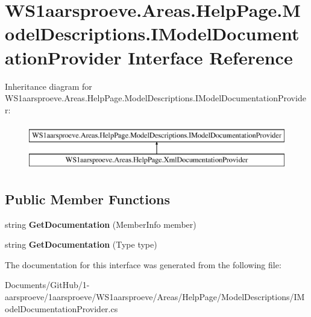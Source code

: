 \hypertarget{interface_w_s1aarsproeve_1_1_areas_1_1_help_page_1_1_model_descriptions_1_1_i_model_documentation_provider}{}\section{W\+S1aarsproeve.\+Areas.\+Help\+Page.\+Model\+Descriptions.\+I\+Model\+Documentation\+Provider Interface Reference}
\label{interface_w_s1aarsproeve_1_1_areas_1_1_help_page_1_1_model_descriptions_1_1_i_model_documentation_provider}
Inheritance diagram for W\+S1aarsproeve.\+Areas.\+Help\+Page.\+Model\+Descriptions.\+I\+Model\+Documentation\+Provider\+:\begin{figure}[H]
\begin{center}
\leavevmode
\includegraphics[height=2.000000cm]{interface_w_s1aarsproeve_1_1_areas_1_1_help_page_1_1_model_descriptions_1_1_i_model_documentation_provider}
\end{center}
\end{figure}
\subsection*{Public Member Functions}
\begin{DoxyCompactItemize}
\item 
\hypertarget{interface_w_s1aarsproeve_1_1_areas_1_1_help_page_1_1_model_descriptions_1_1_i_model_documentation_provider_aae6769d854d69fe1e4a8cae48ba001d1}{}string {\bfseries Get\+Documentation} (Member\+Info member)\label{interface_w_s1aarsproeve_1_1_areas_1_1_help_page_1_1_model_descriptions_1_1_i_model_documentation_provider_aae6769d854d69fe1e4a8cae48ba001d1}

\item 
\hypertarget{interface_w_s1aarsproeve_1_1_areas_1_1_help_page_1_1_model_descriptions_1_1_i_model_documentation_provider_ac007ae121877f091760bcbfa57acb73b}{}string {\bfseries Get\+Documentation} (Type type)\label{interface_w_s1aarsproeve_1_1_areas_1_1_help_page_1_1_model_descriptions_1_1_i_model_documentation_provider_ac007ae121877f091760bcbfa57acb73b}

\end{DoxyCompactItemize}


The documentation for this interface was generated from the following file\+:\begin{DoxyCompactItemize}
\item 
Documents/\+Git\+Hub/1-\/aarsproeve/1aarsproeve/\+W\+S1aarsproeve/\+Areas/\+Help\+Page/\+Model\+Descriptions/I\+Model\+Documentation\+Provider.\+cs\end{DoxyCompactItemize}
